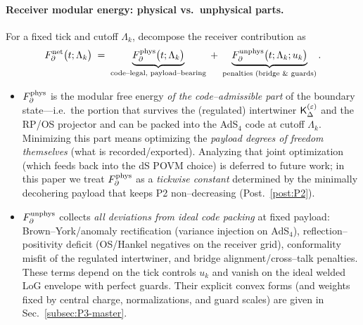 \documentclass[10pt]{article}
\theoremstyle{definition}
\theoremstyle{plain}
\begin{document}
\paragraph{Receiver modular energy: physical vs.\ unphysical parts.}\label{par:uom-main-025}
For a fixed tick and cutoff $\Lambda_k$, decompose the receiver contribution as
\begin{equation}
\label{eq:phys-unphys-split}
F_\partial^{\rm net}\big(t;\Lambda_k\big)\;=\;
\underbrace{F_\partial^{\rm phys}\big(t;\Lambda_k\big)}_{\text{code–legal, payload–bearing}}
\;+\;
\underbrace{F_\partial^{\rm unphys}\big(t;\Lambda_k;u_k\big)}_{\text{penalties (bridge \& guards)}}.
\end{equation}
\begin{itemize}[leftmargin=1.5em, itemsep=2pt]
\item $F_\partial^{\rm phys}$ is the modular free energy \emph{of the code–admissible
part} of the boundary state—i.e.\ the portion that survives the (regulated)
intertwiner ${\sf K}^{(\varepsilon)}_\Delta$ and the RP/OS projector and can be packed
into the AdS$_4$ code at cutoff $\Lambda_k$. Minimizing this part means optimizing
the \emph{payload degrees of freedom themselves} (what is recorded/exported).
Analyzing that joint optimization (which feeds back into the dS POVM choice) is
deferred to future work; in this paper we treat $F_\partial^{\rm phys}$ as a
\emph{tickwise constant} determined by the minimally decohering payload that keeps
P2 non–decreasing (Post.~\ref{post:P2}).
\item $F_\partial^{\rm unphys}$ collects \emph{all deviations from ideal code packing}
at fixed payload: Brown–York/anomaly rectification (variance injection on AdS$_4$),
reflection–positivity deficit (OS/Hankel negatives on the receiver grid), conformality
misfit of the regulated intertwiner, and bridge alignment/cross–talk penalties. These
terms depend on the tick controls $u_k$ and vanish on the ideal welded LoG envelope
with perfect guards. Their explicit convex forms (and weights fixed by central charge,
normalizations, and guard scales) are given in Sec.~\ref{subsec:P3-master}.
\end{itemize}
\end{document}
